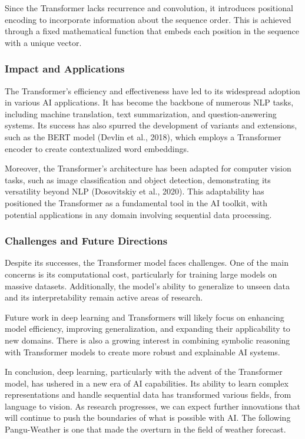 \documentclass[conference]{IEEEtran}
\begin{document}
Since the Transformer lacks recurrence and convolution, it introduces positional encoding to incorporate information about the sequence order. This is achieved through a fixed mathematical function that embeds each position in the sequence with a unique vector.

\subsubsection{Impact and Applications}
The Transformer's efficiency and effectiveness have led to its widespread adoption in various AI applications. It has become the backbone of numerous NLP tasks, including machine translation, text summarization, and question-answering systems. Its success has also spurred the development of variants and extensions, such as the BERT model (Devlin et al., 2018)\cite{b64}, which employs a Transformer encoder to create contextualized word embeddings.

Moreover, the Transformer's architecture has been adapted for computer vision tasks, such as image classification and object detection, demonstrating its versatility beyond NLP (Dosovitskiy et al., 2020)\cite{b65}. This adaptability has positioned the Transformer as a fundamental tool in the AI toolkit, with potential applications in any domain involving sequential data processing.

\subsubsection{Challenges and Future Directions}
Despite its successes, the Transformer model faces challenges. One of the main concerns is its computational cost, particularly for training large models on massive datasets. Additionally, the model's ability to generalize to unseen data and its interpretability remain active areas of research.

Future work in deep learning and Transformers will likely focus on enhancing model efficiency, improving generalization, and expanding their applicability to new domains. There is also a growing interest in combining symbolic reasoning with Transformer models to create more robust and explainable AI systems.

In conclusion, deep learning, particularly with the advent of the Transformer model, has ushered in a new era of AI capabilities. Its ability to learn complex representations and handle sequential data has transformed various fields, from language to vision. As research progresses, we can expect further innovations that will continue to push the boundaries of what is possible with AI. The following Pangu-Weather is one that made the overturn in the field of weather forecast.
\end{document}
